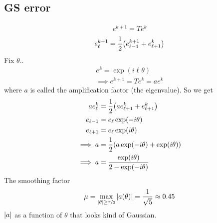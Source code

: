 \documentclass{article}
\begin{document}
            \subsection{GS error}
                \begin{align}
                    e^{k+1} = Te^k
                \end{align}
                \begin{align}
                    e_\ell^{k+1} = \frac{1}{2}\qty(e_{\ell-1}^{k+1} + e_{\ell+1}^{k})
                \end{align}
                Fix $\theta$..
                \begin{align}
                    e^k = \exp(i\ell\theta) \\
                    \implies e^{k+1} = Te^k = ae^k
                \end{align}
                where $a$ is called the amplification factor (the eigenvalue).  So we get
                \begin{align}
                    ae_\ell^k &= \frac{1}{2}\qty(ae_{\ell+1}^k + e_{\ell+1}^k) \\
                    e_{\ell-1} &= e_\ell\exp(-i\theta) \\
                    e_{\ell+1} &= e_\ell\exp(i\theta) \\
                    \implies a &= \frac{1}{2}\qty(a\exp(-i\theta) + \exp(i\theta)) \\
                    \implies a &= \frac{\exp(i\theta)}{2 - \exp(-i\theta)}
                \end{align}
                The smoothing factor
                \begin{align}
                    \mu = \max_{\abs{\theta} \geq \nicefrac{\pi}{2}}\abs{a(\theta)} = \frac{1}{\sqrt{5}} \approx 0.45
                \end{align}
                $\abs{a}$ as a function of $\theta$ that looks kind of Gaussian.
\end{document}
